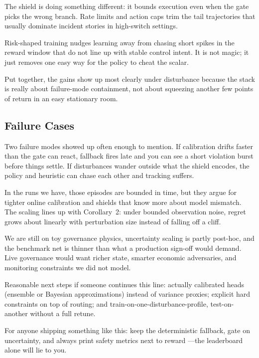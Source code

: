 The shield is doing something different: it bounds execution even when the gate picks the wrong branch. Rate limits and action caps trim the tail trajectories that usually dominate incident stories in high-switch settings.

Risk-shaped training nudges learning away from chasing short spikes in the reward window that do not line up with stable control intent. It is not magic; it just removes one easy way for the policy to cheat the scalar.

Put together, the gains show up most clearly under disturbance because the stack is really about failure-mode containment, not about squeezing another few points of return in an easy stationary room.

\subsection{Failure Cases}

Two failure modes showed up often enough to mention. If calibration drifts faster than the gate can react, fallback fires late and you can see a short violation burst before things settle. If disturbances wander outside what the shield encodes, the policy and heuristic can chase each other and tracking suffers.

In the runs we have, those episodes are bounded in time, but they argue for tighter online calibration and shields that know more about model mismatch. The scaling lines up with Corollary~2: under bounded observation noise, regret grows about linearly with perturbation size instead of falling off a cliff.

We are still on toy governance physics, uncertainty scaling is partly post-hoc, and the benchmark net is thinner than what a production sign-off would demand. Live governance would want richer state, smarter economic adversaries, and monitoring constraints we did not model.

Reasonable next steps if someone continues this line: actually calibrated heads (ensemble or Bayesian approximations) instead of variance proxies; explicit hard constraints on top of routing; and train-on-one-disturbance-profile, test-on-another without a full retune.

For anyone shipping something like this: keep the deterministic fallback, gate on uncertainty, and always print safety metrics next to reward \cite{pineau2021improving,dror2018hitchhikers}---the leaderboard alone will lie to you.

\begin{table}[htbp]
\centering

\caption{When to use this method in practice.}
\label{tab:when-to-use}
\end{table}
